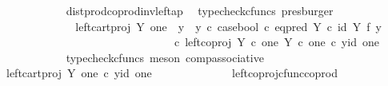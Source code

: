 \begin{isabellebody}
\ \ \ \ \ \ \ \ \ \ \ \ \isamarkupfalse%
\ dist{\isacharunderscore}{\kern0pt}prod{\isacharunderscore}{\kern0pt}coprod{\isacharunderscore}{\kern0pt}inv{\isacharunderscore}{\kern0pt}left{\isacharunderscore}{\kern0pt}ap\ \isamarkupfalse%
\ {\isacharparenleft}{\kern0pt}typecheck{\isacharunderscore}{\kern0pt}cfuncs{\isacharcomma}{\kern0pt}\ presburger{\isacharparenright}{\kern0pt}\isanewline
\ \ \ \ \ \ \ \ \ \ \isamarkupfalse%
\ \isamarkupfalse%
\ {\isachardoublequoteopen}{\isachardot}{\kern0pt}{\isachardot}{\kern0pt}{\isachardot}{\kern0pt}\ {\isacharequal}{\kern0pt}\ {\isacharparenleft}{\kern0pt}{\isacharparenleft}{\kern0pt}left{\isacharunderscore}{\kern0pt}cart{\isacharunderscore}{\kern0pt}proj\ Y\ one\ {\isasymamalg}\ {\isacharparenleft}{\kern0pt}{\isacharparenleft}{\kern0pt}y{}\ {\isasymamalg}\ y{}{\isacharparenright}{\kern0pt}\ {\isasymcirc}\isactrlsub c\ case{\isacharunderscore}{\kern0pt}bool\ {\isasymcirc}\isactrlsub c\ eq{\isacharunderscore}{\kern0pt}pred\ Y\ {\isasymcirc}\isactrlsub c\ {\isacharparenleft}{\kern0pt}id\ Y\ {\isasymtimes}\isactrlsub f\ y{}{\isacharparenright}{\kern0pt}{\isacharparenright}{\kern0pt}{\isacharparenright}{\kern0pt}\ \isanewline
\ \ \ \ \ \ \ \ \ \ \ \ \ \ \ \ \ \ \ \ \ \ \ \ \ \ \ \ \ \ \ \ \ {\isasymcirc}\isactrlsub c\ left{\isacharunderscore}{\kern0pt}coproj\ {\isacharparenleft}{\kern0pt}Y\ {\isasymtimes}\isactrlsub c\ one{\isacharparenright}{\kern0pt}\ {\isacharparenleft}{\kern0pt}Y\ {\isasymtimes}\isactrlsub c\ one{\isacharparenright}{\kern0pt}{\isacharparenright}{\kern0pt}\ {\isasymcirc}\isactrlsub c\ {\isasymlangle}y{\isacharcomma}{\kern0pt}id\ one{\isasymrangle}{\isachardoublequoteclose}\isanewline
\ \ \ \ \ \ \ \ \ \ \ \ \isamarkupfalse%
\ {\isacharparenleft}{\kern0pt}typecheck{\isacharunderscore}{\kern0pt}cfuncs{\isacharcomma}{\kern0pt}\ meson\ comp{\isacharunderscore}{\kern0pt}associative{}{\isacharparenright}{\kern0pt}\isanewline
\ \ \ \ \ \ \ \ \ \ \isamarkupfalse%
\ \isamarkupfalse%
\ {\isachardoublequoteopen}{\isachardot}{\kern0pt}{\isachardot}{\kern0pt}{\isachardot}{\kern0pt}\ {\isacharequal}{\kern0pt}\ left{\isacharunderscore}{\kern0pt}cart{\isacharunderscore}{\kern0pt}proj\ Y\ one\ {\isasymcirc}\isactrlsub c\ {\isasymlangle}y{\isacharcomma}{\kern0pt}id\ one{\isasymrangle}{\isachardoublequoteclose}\isanewline
\ \ \ \ \ \ \ \ \ \ \ \ \isamarkupfalse%
\ left{\isacharunderscore}{\kern0pt}coproj{\isacharunderscore}{\kern0pt}cfunc{\isacharunderscore}{\kern0pt}coprod\ \isamarkupfalse%

\end{isabellebody}
